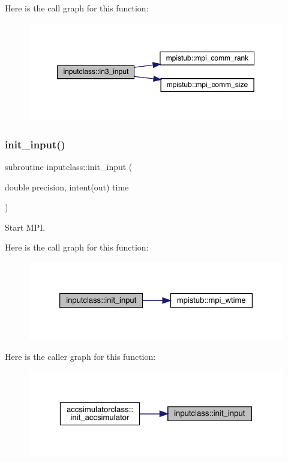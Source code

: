 Here is the call graph for this function\+:\nopagebreak
\begin{figure}[H]
\begin{center}
\leavevmode
\includegraphics[width=350pt]{namespaceinputclass_af6c761d115ea894925da33378b4bdf7d_cgraph}
\end{center}
\end{figure}
\mbox{\label{namespaceinputclass_ae7866a50f5576b1fea0aa1b10f98690b}} 
\subsubsection{\texorpdfstring{init\_input()}{init\_input()}}
{\footnotesize\ttfamily subroutine inputclass\+::init\+\_\+input (\begin{DoxyParamCaption}\item[{double precision, intent(out)}]{time }\end{DoxyParamCaption})}



Start M\+PI. 

Here is the call graph for this function\+:\nopagebreak
\begin{figure}[H]
\begin{center}
\leavevmode
\includegraphics[width=326pt]{namespaceinputclass_ae7866a50f5576b1fea0aa1b10f98690b_cgraph}
\end{center}
\end{figure}
Here is the caller graph for this function\+:\nopagebreak
\begin{figure}[H]
\begin{center}
\leavevmode
\includegraphics[width=323pt]{namespaceinputclass_ae7866a50f5576b1fea0aa1b10f98690b_icgraph}
\end{center}
\end{figure}

